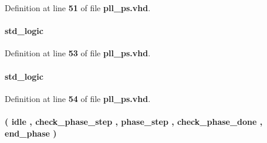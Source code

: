 Definition at line {\bf 51} of file {\bf pll\+\_\+ps.\+vhd}.

\paragraph[{pll\+\_\+phasedone\+\_\+neg\+\_\+reg}]{ {\bfseries \textcolor{comment}{std\+\_\+logic}\textcolor{vhdlchar}{ }} \hspace{0.3cm}{\ttfamily [Signal]}}\label{classpll__ps_1_1arch_ad82f315423726afe53a952a9054ae0fc}


Definition at line {\bf 53} of file {\bf pll\+\_\+ps.\+vhd}.

\paragraph[{pll\+\_\+phasedone\+\_\+pos\+\_\+reg}]{ {\bfseries \textcolor{comment}{std\+\_\+logic}\textcolor{vhdlchar}{ }} \hspace{0.3cm}{\ttfamily [Signal]}}\label{classpll__ps_1_1arch_ab68831ba74c59700417a14bc93f71ed5}


Definition at line {\bf 54} of file {\bf pll\+\_\+ps.\+vhd}.

\paragraph[{state\+\_\+type}]{ {\bfseries \textcolor{vhdlchar}{(}\textcolor{vhdlchar}{ }\textcolor{vhdlchar}{idle}\textcolor{vhdlchar}{ }\textcolor{vhdlchar}{,}\textcolor{vhdlchar}{ }\textcolor{vhdlchar}{check\+\_\+phase\+\_\+step}\textcolor{vhdlchar}{ }\textcolor{vhdlchar}{,}\textcolor{vhdlchar}{ }\textcolor{vhdlchar}{phase\+\_\+step}\textcolor{vhdlchar}{ }\textcolor{vhdlchar}{,}\textcolor{vhdlchar}{ }\textcolor{vhdlchar}{check\+\_\+phase\+\_\+done}\textcolor{vhdlchar}{ }\textcolor{vhdlchar}{,}\textcolor{vhdlchar}{ }\textcolor{vhdlchar}{end\+\_\+phase}\textcolor{vhdlchar}{ }\textcolor{vhdlchar}{)}\textcolor{vhdlchar}{ }} \hspace{0.3cm}{\ttfamily [Type]}}\label{classpll__ps_1_1arch_a6baa20c5eb9edd0a2872f6857966982e}


